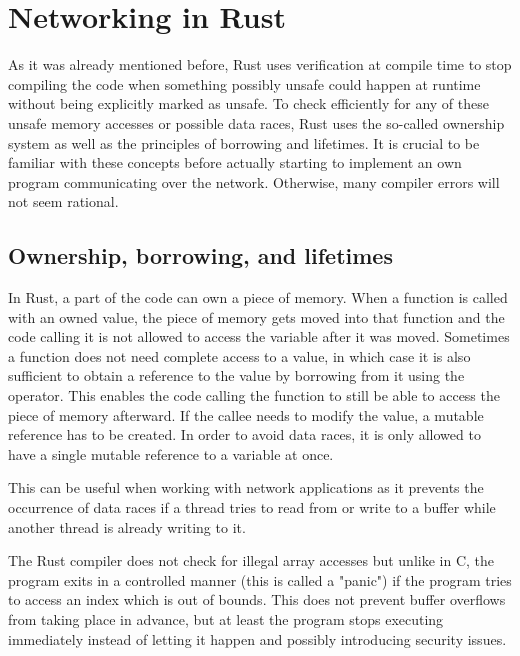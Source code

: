 
\section{Networking in Rust} \label{networking-in-rust}
As it was already mentioned before, Rust uses verification at compile time to stop compiling the code when something
possibly unsafe could happen at runtime without being explicitly marked as unsafe. To check efficiently for any of
these unsafe memory accesses or possible data races, Rust uses the so-called ownership system as well as the principles
of borrowing and lifetimes. It is crucial to be familiar with these concepts before actually starting to implement an
own program communicating over the network. Otherwise, many compiler errors will not seem rational.

\subsection{Ownership, borrowing, and lifetimes}
In Rust, a part of the code can own a piece of memory. When a function is called with an owned value, the piece of
memory gets moved into that function and the code calling it is not allowed to access the variable after it was moved.
Sometimes a function does not need complete access to a value, in which case it is also sufficient to obtain a
reference to the value by borrowing from it using the \rust{&} operator. This enables the code calling the function to
still be able to access the piece of memory afterward. If the callee needs to modify the value, a mutable reference has
to be created. In order to avoid data races, it is only allowed to have a single mutable reference to a variable at
once.

This can be useful when working with network applications as it prevents the occurrence of data races if a thread tries
to read from or write to a buffer while another thread is already writing to it.

The Rust compiler does not check for illegal array accesses but unlike in C, the program exits in a controlled manner
(this is called a "panic") if the program tries to access an index which is out of bounds. This does not prevent buffer
overflows from taking place in advance, but at least the program stops executing immediately instead of letting it
happen and possibly introducing security issues.

